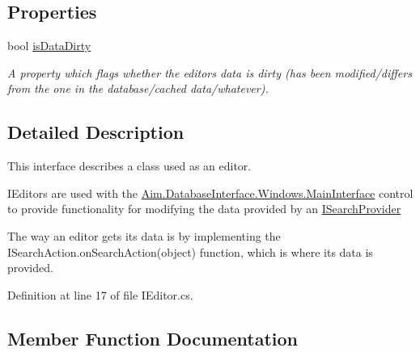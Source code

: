 \subsection*{Properties}
\begin{DoxyCompactItemize}
\item 
bool \mbox{\hyperlink{interface_aim_1_1_database_interface_1_1_interfaces_1_1_i_editor_a6337e77ced99ce194926db76e0f0c10a}{is\+Data\+Dirty}}
\begin{DoxyCompactList}\small\item\em A property which flags whether the editor\textquotesingle{}s data is dirty (has been modified/differs from the one in the database/cached data/whatever). \end{DoxyCompactList}\end{DoxyCompactItemize}


\subsection{Detailed Description}
This interface describes a class used as an editor. 

I\+Editors are used with the \mbox{\hyperlink{class_aim_1_1_database_interface_1_1_windows_1_1_main_interface}{Aim.\+Database\+Interface.\+Windows.\+Main\+Interface}} control to provide functionality for modifying the data provided by an \mbox{\hyperlink{interface_aim_1_1_database_interface_1_1_interfaces_1_1_i_search_provider}{I\+Search\+Provider}}

The way an editor gets it\textquotesingle{}s data is by implementing the I\+Search\+Action.\+on\+Search\+Action(object) function, which is where it\textquotesingle{}s data is provided. 

Definition at line 17 of file I\+Editor.\+cs.



\subsection{Member Function Documentation}
\mbox{\label{interface_aim_1_1_database_interface_1_1_interfaces_1_1_i_editor_af807eaca31352ebcef7a868941a1b20f}} 
